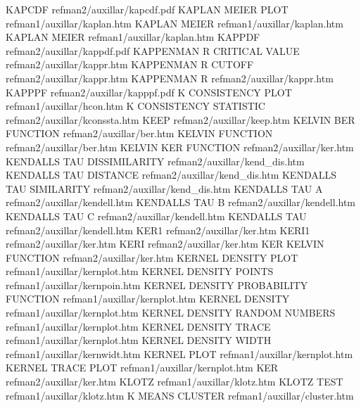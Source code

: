 KAPCDF                                  refman2/auxillar/kapcdf.pdf
KAPLAN MEIER PLOT                       refman1/auxillar/kaplan.htm
KAPLAN MEIER                            refman1/auxillar/kaplan.htm
KAPLAN MEIER                            refman1/auxillar/kaplan.htm
KAPPDF                                  refman2/auxillar/kappdf.pdf
KAPPENMAN R CRITICAL VALUE              refman2/auxillar/kappr.htm
KAPPENMAN R CUTOFF                      refman2/auxillar/kappr.htm
KAPPENMAN R                             refman2/auxillar/kappr.htm
KAPPPF                                  refman2/auxillar/kapppf.pdf
K CONSISTENCY PLOT                      refman1/auxillar/hcon.htm
K CONSISTENCY STATISTIC                 refman2/auxillar/kconssta.htm
KEEP                                    refman2/auxillar/keep.htm
KELVIN BER FUNCTION                     refman2/auxillar/ber.htm
KELVIN FUNCTION                         refman2/auxillar/ber.htm
KELVIN KER FUNCTION                     refman2/auxillar/ker.htm
KENDALLS TAU DISSIMILARITY              refman2/auxillar/kend_dis.htm
KENDALLS TAU DISTANCE                   refman2/auxillar/kend_dis.htm
KENDALLS TAU SIMILARITY                 refman2/auxillar/kend_dis.htm
KENDALLS TAU A                          refman2/auxillar/kendell.htm
KENDALLS TAU B                          refman2/auxillar/kendell.htm
KENDALLS TAU C                          refman2/auxillar/kendell.htm
KENDALLS TAU                            refman2/auxillar/kendell.htm
KER1                                    refman2/auxillar/ker.htm
KERI1                                   refman2/auxillar/ker.htm
KERI                                    refman2/auxillar/ker.htm
KER KELVIN FUNCTION                     refman2/auxillar/ker.htm
KERNEL DENSITY PLOT                     refman1/auxillar/kernplot.htm
KERNEL DENSITY POINTS                   refman1/auxillar/kernpoin.htm
KERNEL DENSITY PROBABILITY FUNCTION     refman1/auxillar/kernplot.htm
KERNEL DENSITY                          refman1/auxillar/kernplot.htm
KERNEL DENSITY RANDOM NUMBERS           refman1/auxillar/kernplot.htm
KERNEL DENSITY TRACE                    refman1/auxillar/kernplot.htm
KERNEL DENSITY WIDTH                    refman1/auxillar/kernwidt.htm
KERNEL PLOT                             refman1/auxillar/kernplot.htm
KERNEL TRACE PLOT                       refman1/auxillar/kernplot.htm
KER                                     refman2/auxillar/ker.htm
KLOTZ                                   refman1/auxillar/klotz.htm
KLOTZ TEST                              refman1/auxillar/klotz.htm
K MEANS CLUSTER                         refman1/auxillar/cluster.htm
